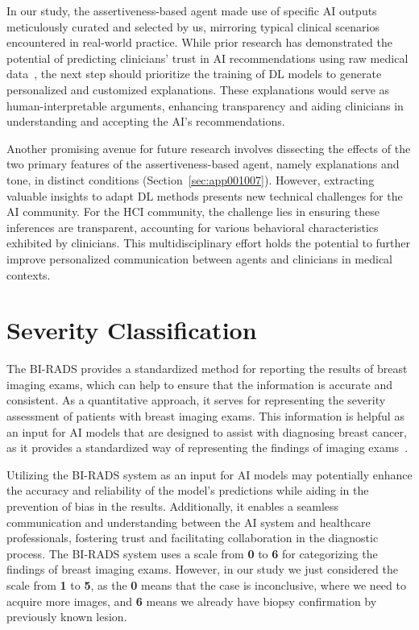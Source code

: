 \textcolor{revised}{In our study, the assertiveness-based agent made use of specific \ac{AI} outputs meticulously curated and selected by us, mirroring typical clinical scenarios encountered in real-world practice.
While prior research has demonstrated the potential of predicting clinicians' trust in \ac{AI} recommendations using raw medical data~\cite{pmlr-v97-raghu19a}, the next step should prioritize the training of \ac{DL} models to generate personalized and customized explanations.
These explanations would serve as human-interpretable arguments, enhancing transparency and aiding clinicians in understanding and accepting the \ac{AI}'s recommendations.}

\textcolor{revised}{Another promising avenue for future research involves dissecting the effects of the two primary features of the assertiveness-based agent, namely explanations and tone, in distinct conditions (Section~\ref{sec:app001007}).
However, extracting valuable insights to adapt \ac{DL} methods presents new technical challenges for the \ac{AI} community.
For the \ac{HCI} community, the challenge lies in ensuring these inferences are transparent, accounting for various behavioral characteristics exhibited by clinicians.
This multidisciplinary effort holds the potential to further improve personalized communication between agents and clinicians in medical contexts.}

\section{Severity Classification}
\label{sec:app005009}

The \ac{BI-RADS} provides a standardized method for reporting the results of breast imaging exams, which can help to ensure that the information is accurate and consistent.
As a quantitative approach, it serves for representing the severity assessment of patients with breast imaging exams.
This information is helpful as an input for \ac{AI} models that are designed to assist with diagnosing breast cancer, as it provides a standardized way of representing the findings of imaging exams~\cite{MAICAS2019101562}.

\textcolor{revised}{Utilizing the \ac{BI-RADS} system as an input for \ac{AI} models may potentially enhance the accuracy and reliability of the model's predictions while aiding in the prevention of bias in the results.}
Additionally, it enables a seamless communication and understanding between the \ac{AI} system and healthcare professionals, fostering trust and facilitating collaboration in the diagnostic process.
The \ac{BI-RADS} system uses a scale from {\bf 0} to {\bf 6} for categorizing the findings of breast imaging exams.
However, in our study we just considered the scale from {\bf 1} to {\bf 5}, as the {\bf 0} means that the case is inconclusive, where we need to acquire more images, and {\bf 6} means we already have biopsy confirmation by previously known lesion.

